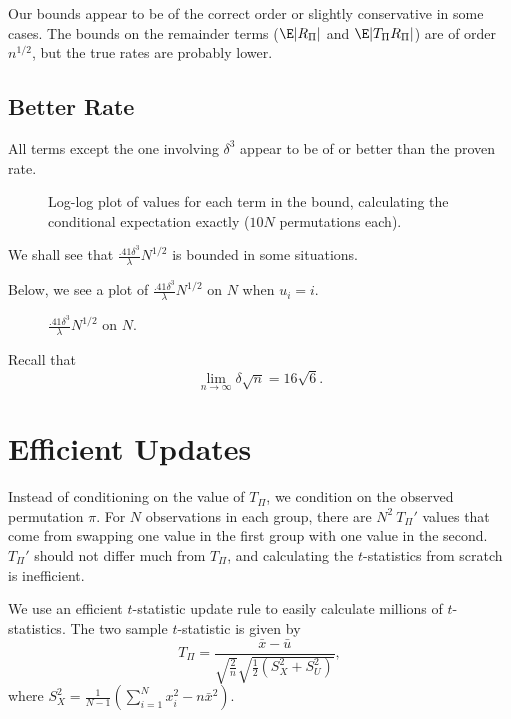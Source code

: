 Our bounds appear to be of the correct order or slightly conservative in some cases.  The bounds on
the remainder terms ($\E |R_{\Pi}|$ and $\E |T_{\Pi}R_{\Pi}|$) are of order $n^{1/2}$, but the true
rates are probably lower.
\clearpage

\subsection{Better Rate}
All terms except the one involving $\delta^3$ appear to be of or better than the proven rate.
\begin{figure}[!ht]
  \centering
  
  \caption{Log-log plot of values for each term in the bound, calculating the conditional
    expectation exactly ($10N$ permutations each).}
\end{figure}

We shall see that $\frac{.41 \delta^3}{\lambda}N^{1/2}$ is bounded in some situations.
\clearpage

Below, we see a plot of $\frac{.41 \delta^3}{\lambda}N^{1/2}$ on $N$
when $u_i = i$.
\begin{figure}[!ht]
  \centering
  
  \caption{$\frac{.41 \delta^3}{\lambda}N^{1/2}$ on $N$.}
\end{figure}

Recall that
\begin{equation*}
  \lim_{n \to \infty} \delta \sqrt{n} = 16 \sqrt{6}.
\end{equation*}

\section{Efficient Updates}
\label{S:efficient-updates}
Instead of conditioning on the value of $T_{\Pi}$, we condition on the
observed permutation $\pi$.  For $N$ observations in each group, there
are $N^2 \: T_{\Pi}'$ values that come from swapping one value in the first
group with one value in the second.  $T_{\Pi}'$ should not differ much from
$T_{\Pi}$, and calculating the $t$-statistics from scratch is inefficient.

We use an efficient $t$-statistic update rule to easily calculate
millions of $t$-statistics.  The two sample $t$-statistic is given by
\begin{equation*}
  T_{\Pi} = \frac{\bar{x}-\bar{u}}
  {\sqrt{\frac{2}{n}}\sqrt{\frac{1}{2}(S_X^2+S_U^2)}},
\end{equation*}
where $S_X^2=\frac{1}{N-1}(\sum_{i=1}^Nx_i^2-n\bar{x}^2)$.

